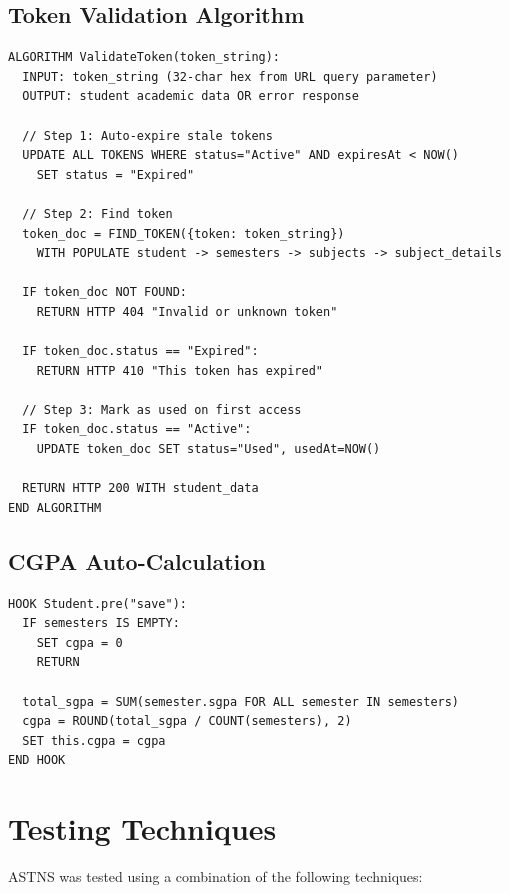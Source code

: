 \documentclass[12pt,a4paper]{report}
\begin{document}
\subsection{Token Validation Algorithm}

\begin{verbatim}
ALGORITHM ValidateToken(token_string):
  INPUT: token_string (32-char hex from URL query parameter)
  OUTPUT: student academic data OR error response

  // Step 1: Auto-expire stale tokens
  UPDATE ALL TOKENS WHERE status="Active" AND expiresAt < NOW()
    SET status = "Expired"

  // Step 2: Find token
  token_doc = FIND_TOKEN({token: token_string})
    WITH POPULATE student -> semesters -> subjects -> subject_details

  IF token_doc NOT FOUND:
    RETURN HTTP 404 "Invalid or unknown token"

  IF token_doc.status == "Expired":
    RETURN HTTP 410 "This token has expired"

  // Step 3: Mark as used on first access
  IF token_doc.status == "Active":
    UPDATE token_doc SET status="Used", usedAt=NOW()

  RETURN HTTP 200 WITH student_data
END ALGORITHM
\end{verbatim}

\subsection{CGPA Auto-Calculation}

\begin{verbatim}
HOOK Student.pre("save"):
  IF semesters IS EMPTY:
    SET cgpa = 0
    RETURN

  total_sgpa = SUM(semester.sgpa FOR ALL semester IN semesters)
  cgpa = ROUND(total_sgpa / COUNT(semesters), 2)
  SET this.cgpa = cgpa
END HOOK
\end{verbatim}

\section{Testing Techniques}
ASTNS was tested using a combination of the following techniques:
\end{document}
